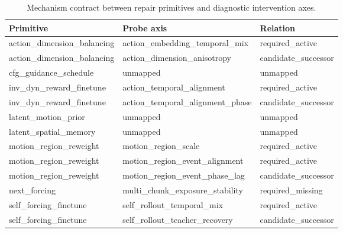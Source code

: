 \begin{table}[t]
\centering\small
\caption{Mechanism contract between repair primitives and diagnostic intervention axes.}
\label{tab:primitive_probe_affinity}
\begin{tabular}{lll}
\toprule
Primitive & Probe axis & Relation \\
\midrule
action\_dimension\_balancing & action\_embedding\_temporal\_mix & required\_active \\
action\_dimension\_balancing & action\_dimension\_anisotropy & candidate\_successor \\
cfg\_guidance\_schedule & unmapped & unmapped \\
inv\_dyn\_reward\_finetune & action\_temporal\_alignment & required\_active \\
inv\_dyn\_reward\_finetune & action\_temporal\_alignment\_phase & candidate\_successor \\
latent\_motion\_prior & unmapped & unmapped \\
latent\_spatial\_memory & unmapped & unmapped \\
motion\_region\_reweight & motion\_region\_scale & required\_active \\
motion\_region\_reweight & motion\_region\_event\_alignment & required\_active \\
motion\_region\_reweight & motion\_region\_event\_phase\_lag & candidate\_successor \\
next\_forcing & multi\_chunk\_exposure\_stability & required\_missing \\
self\_forcing\_finetune & self\_rollout\_temporal\_mix & required\_active \\
self\_forcing\_finetune & self\_rollout\_teacher\_recovery & candidate\_successor \\
\bottomrule
\end{tabular}
\end{table}
